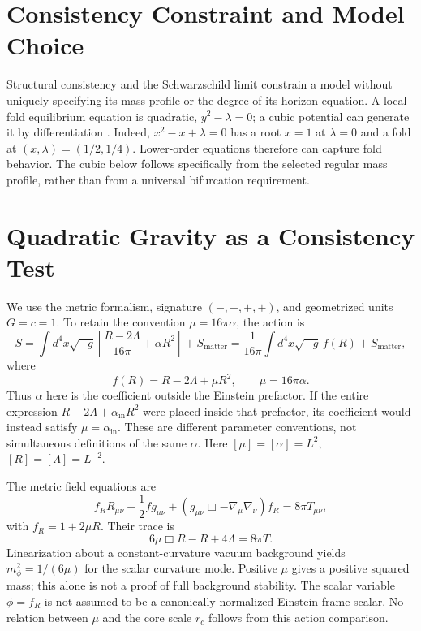 \documentclass[11pt,final]{article}
\begin{document}
\section{Consistency Constraint and Model Choice}

Structural consistency and the Schwarzschild limit constrain a model without
uniquely specifying its mass profile or the degree of its horizon equation.
A local fold equilibrium equation is quadratic, $y^2-\lambda=0$; a cubic
potential can generate it by differentiation \cite{chasnov2020}.
Indeed, $x^2-x+\lambda=0$ has a root $x=1$ at $\lambda=0$ and a fold at
$(x,\lambda)=(1/2,1/4)$. Lower-order equations therefore can capture fold
behavior. The cubic below follows specifically from the selected regular
mass profile, rather than from a universal bifurcation requirement.

\section{Quadratic Gravity as a Consistency Test}

We use the metric formalism, signature $(-,+,+,+)$, and geometrized units
$G=c=1$. To retain the convention $\mu=16\pi\alpha$, the action is
\begin{equation}
S=\int d^4x\sqrt{-g}
\left[\frac{R-2\Lambda}{16\pi}+\alpha R^2\right]+S_{\mathrm{matter}}
=\frac{1}{16\pi}\int d^4x\sqrt{-g}\,f(R)+S_{\mathrm{matter}},
\end{equation}
where
\begin{equation}
f(R)=R-2\Lambda+\mu R^2,\qquad \mu=16\pi\alpha.
\end{equation}
Thus $\alpha$ here is the coefficient outside the Einstein prefactor. If the
entire expression $R-2\Lambda+\alpha_{\mathrm{in}}R^2$ were placed inside
that prefactor, its coefficient would instead satisfy $\mu=\alpha_{\mathrm{in}}$.
These are different parameter conventions, not simultaneous definitions of
the same $\alpha$. Here $[\mu]=[\alpha]=L^2$, $[R]=[\Lambda]=L^{-2}$.

The metric field equations are \cite{sotiriou2010,defelice2010}
\begin{equation}
f_R R_{\mu\nu}-\frac{1}{2}f g_{\mu\nu}
 +(g_{\mu\nu}\Box-\nabla_\mu\nabla_\nu)f_R=8\pi T_{\mu\nu},
\end{equation}
with $f_R=1+2\mu R$. Their trace is
\begin{equation}
6\mu\Box R-R+4\Lambda=8\pi T.
\label{eq:fr_trace}
\end{equation}
Linearization about a constant-curvature vacuum background yields
$m_\phi^2=1/(6\mu)$ for the scalar curvature mode. Positive $\mu$ gives a
positive squared mass; this alone is not a proof of full background stability.
The scalar variable $\phi=f_R$ is not assumed to be a canonically normalized
Einstein-frame scalar. No relation between $\mu$ and the core scale $r_c$ follows
from this action comparison.
\end{document}
